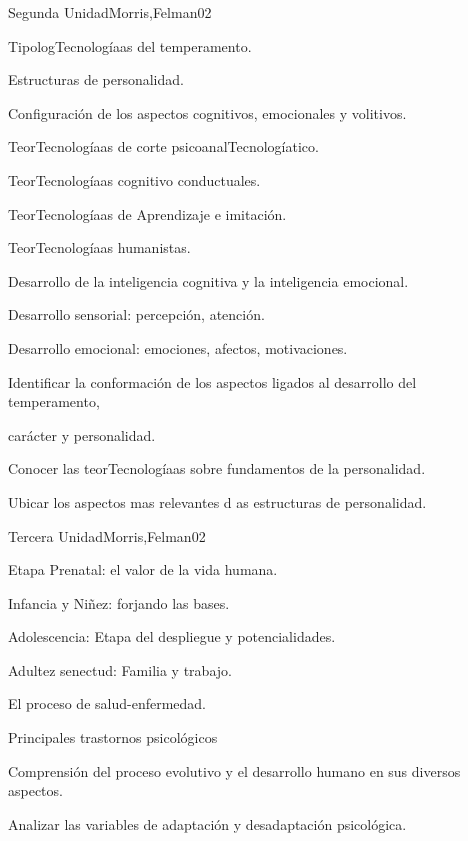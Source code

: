 \begin{syllabus}
\begin{unit}{Segunda Unidad}{Morris,Felman}{0}{2}
\begin{topics}
	\item TipologTecnologíaas del temperamento.
	\item Estructuras de personalidad.
	\item Configuración de los aspectos cognitivos, emocionales y volitivos.
	\item TeorTecnologíaas de corte psicoanalTecnologíatico.
	\item TeorTecnologíaas cognitivo conductuales.
	\item TeorTecnologíaas de Aprendizaje e imitación.
	\item TeorTecnologíaas humanistas.
	\item Desarrollo de la inteligencia cognitiva y la inteligencia emocional.
	\item Desarrollo sensorial: percepción, atención.
	\item Desarrollo emocional: emociones, afectos, motivaciones.
\end{topics}
\begin{learningoutcomes}
	\item Identificar la conformación de los aspectos ligados al desarrollo del temperamento,  
	\item       carácter y personalidad.
	\item Conocer las teorTecnologíaas sobre fundamentos de la personalidad.
	\item Ubicar los aspectos mas relevantes d as estructuras de personalidad.
\end{learningoutcomes}
\end{unit}

\begin{unit}{Tercera Unidad}{Morris,Felman}{0}{2}
\begin{topics}
	\item  Etapa Prenatal: el valor de la vida humana.
	\item Infancia y Niñez: forjando las bases.
	\item Adolescencia: Etapa del despliegue y potencialidades.
	\item Adultez senectud: Familia y trabajo.
	\item El proceso de salud-enfermedad.
	\item Principales trastornos psicológicos
\end{topics}
\begin{learningoutcomes}
	\item Comprensión del proceso evolutivo y el desarrollo humano en sus diversos aspectos.
	\item Analizar las variables de adaptación y desadaptación psicológica.
\end{learningoutcomes}
\end{unit}


\end{syllabus}
